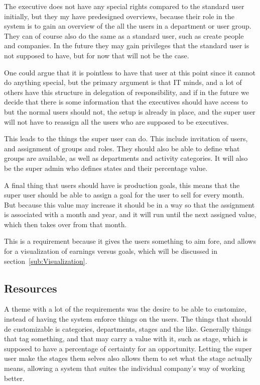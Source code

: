 The executive does not have any special rights compared to the standard user initially, but they my have predesigned overviews, because their role in the system is to gain an overview of the all the users in a department or user group. They can of course also do the same as a standard user, such as create people and companies. In the future they may gain privileges that the standard user is not supposed to have, but for now that will not be the case.

One could argue that it is pointless to have that user at this point since it cannot do anything special, but the primary argument is that IT minds, and a lot of others have this structure in delegation of responsibility, and if in the future we decide that there is some information that the executives should have access to but the normal users should not, the setup is already in place, and the super user will not have to reassign all the users who are supposed to be executives.

This leads to the things the super user can do. This include invitation of users, and assignment of groups and roles. They should also be able to define what groups are available, as well as departments and activity categories. It will also be the super admin who defines states and their percentage value.

A final thing that users should have is production goals, this means that the super user should be able to assign a goal for the user to sell for every month. But because this value may increase it should be in a way so that the assignment is associated with a month and year, and it will run until the next assigned value, which then takes over from that month.

This is a requirement because it gives the users something to aim fore, and allows for a visualization of earnings versus goals, which will be discussed in section~\ref{sub:Visualization}.

\subsection{Resources}
\label{sub:Resources}

A theme with a lot of the requirements was the desire to be able to customize, instead of having the system enforce things on the users. The things that should de customizable is categories, departments, stages and the like. Generally things that tag something, and that may carry a value with it, such as stage, which is supposed to have a percentage of certainty for an opportunity. Letting the super user make the stages them selves also allows them to set what the stage actually means, allowing a system that suites the individual company's way of working better.

